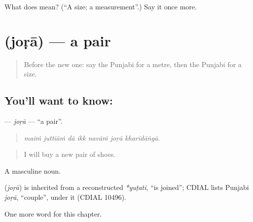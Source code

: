 \begin{tcolorbox}[breakable,colback=teal!4,colframe=teal!35!black,title={Before you move on}]
What does  mean? (\textquotedblleft{}A size; a measurement\textquotedblright{}.) Say it once more.
\end{tcolorbox}
\section[\texorpdfstring{\pa{ਜੋੜਾ} (joṛā)}{ਜੋੜਾ (joṛā)}]{ (joṛā) — a pair}

\label{lesson:PA-C274-jora}



\begin{quote}
Before the new one: say the Punjabi for a metre, then the Punjabi for a size.
\end{quote}

\subsection*{You'll want to know: }
\textbf{} — \emph{joṛā} — \textquotedblleft{}a pair\textquotedblright{}.

\begin{quote}
      
\end{quote}

\begin{quote}
\emph{maiṁ juttīāṁ dā ikk navāṁ joṛā kharīdāṅgā.}
\end{quote}

\begin{quote}
I will buy a new pair of shoes.
\end{quote}

A masculine noun.

\begin{cousinweb}
\textbf{} (\emph{joṛā}) is inherited from a reconstructed \emph{*yuṭati}, \textquotedblleft{}is joined\textquotedblright{}; CDIAL lists Punjabi \emph{joṛā}, \textquotedblleft{}couple\textquotedblright{}, under it (CDIAL 10496).
\end{cousinweb}

\begin{grammarlens}[title={What you've built}]
One more word for this chapter.
\end{grammarlens}

